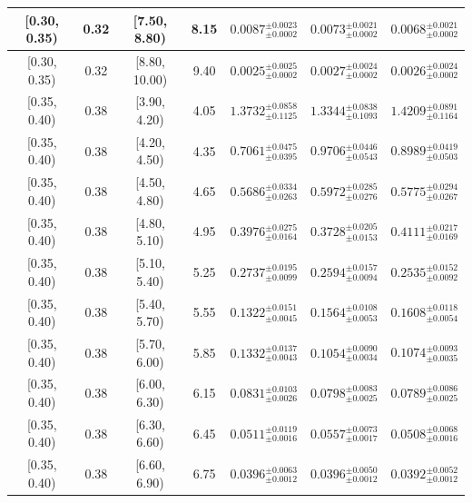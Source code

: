 \begin{longtable}{|c|c|c|c|c|c|c|}
\hline
[0.30, 0.35) & 0.32 & [7.50, 8.80) & 8.15 & $0.0087^{ \pm 0.0023 }_{ \pm 0.0002 }$ & $0.0073^{ \pm 0.0021 }_{ \pm 0.0002 }$ & $0.0068^{ \pm 0.0021 }_{ \pm 0.0002 }$ \\ 
\hline
[0.30, 0.35) & 0.32 & [8.80, 10.00) & 9.40 & $0.0025^{ \pm 0.0025 }_{ \pm 0.0002 }$ & $0.0027^{ \pm 0.0024 }_{ \pm 0.0002 }$ & $0.0026^{ \pm 0.0024 }_{ \pm 0.0002 }$ \\ 
\hline
[0.35, 0.40) & 0.38 & [3.90, 4.20) & 4.05 & $1.3732^{ \pm 0.0858 }_{ \pm 0.1125 }$ & $1.3344^{ \pm 0.0838 }_{ \pm 0.1093 }$ & $1.4209^{ \pm 0.0891 }_{ \pm 0.1164 }$ \\ 
\hline
[0.35, 0.40) & 0.38 & [4.20, 4.50) & 4.35 & $0.7061^{ \pm 0.0475 }_{ \pm 0.0395 }$ & $0.9706^{ \pm 0.0446 }_{ \pm 0.0543 }$ & $0.8989^{ \pm 0.0419 }_{ \pm 0.0503 }$ \\ 
\hline
[0.35, 0.40) & 0.38 & [4.50, 4.80) & 4.65 & $0.5686^{ \pm 0.0334 }_{ \pm 0.0263 }$ & $0.5972^{ \pm 0.0285 }_{ \pm 0.0276 }$ & $0.5775^{ \pm 0.0294 }_{ \pm 0.0267 }$ \\ 
\hline
[0.35, 0.40) & 0.38 & [4.80, 5.10) & 4.95 & $0.3976^{ \pm 0.0275 }_{ \pm 0.0164 }$ & $0.3728^{ \pm 0.0205 }_{ \pm 0.0153 }$ & $0.4111^{ \pm 0.0217 }_{ \pm 0.0169 }$ \\ 
\hline
[0.35, 0.40) & 0.38 & [5.10, 5.40) & 5.25 & $0.2737^{ \pm 0.0195 }_{ \pm 0.0099 }$ & $0.2594^{ \pm 0.0157 }_{ \pm 0.0094 }$ & $0.2535^{ \pm 0.0152 }_{ \pm 0.0092 }$ \\ 
\hline
[0.35, 0.40) & 0.38 & [5.40, 5.70) & 5.55 & $0.1322^{ \pm 0.0151 }_{ \pm 0.0045 }$ & $0.1564^{ \pm 0.0108 }_{ \pm 0.0053 }$ & $0.1608^{ \pm 0.0118 }_{ \pm 0.0054 }$ \\ 
\hline
[0.35, 0.40) & 0.38 & [5.70, 6.00) & 5.85 & $0.1332^{ \pm 0.0137 }_{ \pm 0.0043 }$ & $0.1054^{ \pm 0.0090 }_{ \pm 0.0034 }$ & $0.1074^{ \pm 0.0093 }_{ \pm 0.0035 }$ \\ 
\hline
[0.35, 0.40) & 0.38 & [6.00, 6.30) & 6.15 & $0.0831^{ \pm 0.0103 }_{ \pm 0.0026 }$ & $0.0798^{ \pm 0.0083 }_{ \pm 0.0025 }$ & $0.0789^{ \pm 0.0086 }_{ \pm 0.0025 }$ \\ 
\hline
[0.35, 0.40) & 0.38 & [6.30, 6.60) & 6.45 & $0.0511^{ \pm 0.0119 }_{ \pm 0.0016 }$ & $0.0557^{ \pm 0.0073 }_{ \pm 0.0017 }$ & $0.0508^{ \pm 0.0068 }_{ \pm 0.0016 }$ \\ 
\hline
[0.35, 0.40) & 0.38 & [6.60, 6.90) & 6.75 & $0.0396^{ \pm 0.0063 }_{ \pm 0.0012 }$ & $0.0396^{ \pm 0.0050 }_{ \pm 0.0012 }$ & $0.0392^{ \pm 0.0052 }_{ \pm 0.0012 }$ \\ 
\hline

\end{longtable}
